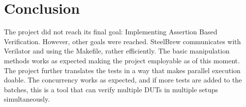 \section{Conclusion}\label{sec:07}
The project did not reach its final goal: Implementing Assertion Based Verification.\newline
However, other goals were reached. SteelBrew communicates with Verilator and using the Makefile, rather efficiently. The basic manipulation methods works as expected making the project employable as of this moment. The project further translates the tests in a way that makes parallel execution doable. The concurrency works as expected, and if more tests are added to the batches, this is a tool that can verify multiple DUTs in multiple setups simultaneously.
